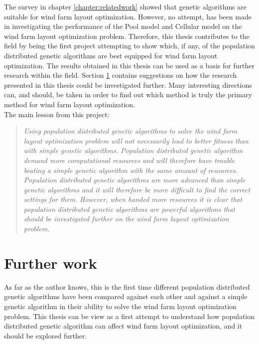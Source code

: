 \noindent The survey in chapter \ref{chapter:relatedwork} showed that genetic algorithms are suitable for wind farm layout optimization. However, no attempt, has been made in investigating the performance of the Pool model and Cellular model on the wind farm layout optimization problem. Therefore, this thesis contributes to the field by being the first project attempting to show which, if any, of the population distributed genetic algorithms are best equipped for wind farm layout optimization. The results obtained in this thesis can be used as a basis for further research within the field. Section \ref{section:further work} contains suggestions on how the research presented in this thesis could be investigated further. Many interesting directions can, and should, be taken in order to find out which method is truly the primary method for wind farm layout optimization.\\


\noindent The main lesson from this project:\\


\begin{quote}
\textit{Using population distributed genetic algorithms to solve the wind farm layout optimization problem will not necessarily lead to better fitness than with simple genetic algorithms. Population distributed genetic algorithm demand more computational resources and will therefore have trouble beating a simple genetic algorithm with the same amount of resources. Population distributed genetic algorithms are more advanced than simple genetic algorithms and it will therefore be more difficult to find the correct settings for them. However, when handed more resources it is clear that population distributed genetic algorithms are powerful algorithms that should be investigated further on the wind farm layout optimization problem.}
\end{quote}


\section{Further work}\label{section:further work}
As far as the author knows, this is the first time different population distributed genetic algorithms have been compared against each other and against a simple genetic algorithm in their ability to solve the wind farm layout optimization problem. This thesis can be view as a first attempt to understand how population distributed genetic algorithm can affect wind farm layout optimization, and it should be explored further.\\


